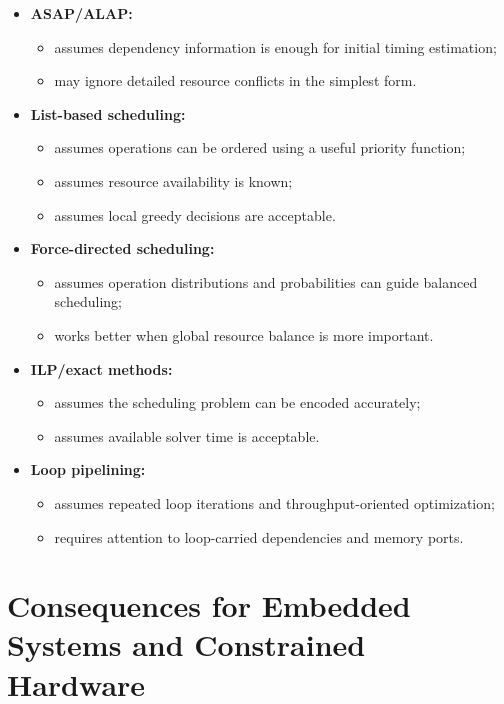 \documentclass[11pt,a4paper]{article}
\begin{document}
\begin{itemize}[leftmargin=*]
    \item \textbf{ASAP/ALAP:}
    \begin{itemize}
        \item assumes dependency information is enough for initial timing estimation;
        \item may ignore detailed resource conflicts in the simplest form.
    \end{itemize}
    \item \textbf{List-based scheduling:}
    \begin{itemize}
        \item assumes operations can be ordered using a useful priority function;
        \item assumes resource availability is known;
        \item assumes local greedy decisions are acceptable.
    \end{itemize}
    \item \textbf{Force-directed scheduling:}
    \begin{itemize}
        \item assumes operation distributions and probabilities can guide balanced scheduling;
        \item works better when global resource balance is more important.
    \end{itemize}
    \item \textbf{ILP/exact methods:}
    \begin{itemize}
        \item assumes the scheduling problem can be encoded accurately;
        \item assumes available solver time is acceptable.
    \end{itemize}
    \item \textbf{Loop pipelining:}
    \begin{itemize}
        \item assumes repeated loop iterations and throughput-oriented optimization;
        \item requires attention to loop-carried dependencies and memory ports.
    \end{itemize}
\end{itemize}

\section{Consequences for Embedded Systems and Constrained Hardware}
\end{document}
